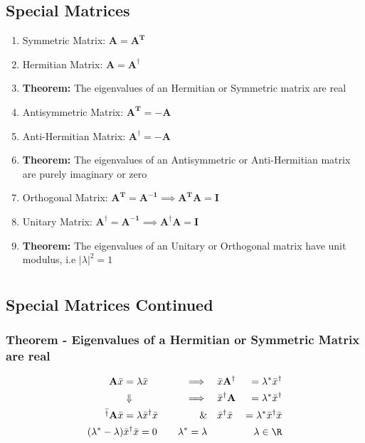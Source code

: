 \documentclass[a4paper, 11pt, normalem]{report}
\begin{document}
\section{Special Matrices}
\begin{enumerate}
    \item Symmetric Matrix: $\mathbf{A} = \mathbf{A^T}$
    \item Hermitian Matrix: $\mathbf{A} = \mathbf{A^{\dagger}}$
    \item[] \textbf{Theorem:} The eigenvalues of an Hermitian or Symmetric matrix are real
    \item Antisymmetric Matrix: $\mathbf{A^T} = -\mathbf{A}$
    \item Anti-Hermitian Matrix: $\mathbf{A^{\dagger}} = -\mathbf{A}$
    \item[] \textbf{Theorem:} The eigenvalues of an Antisymmetric or Anti-Hermitian matrix are purely imaginary or zero
    \item Orthogonal Matrix: $\mathbf{A^T} = \mathbf{A^{-1}} \implies \mathbf{A^{T}A} = \mathbf{I}$
    \item Unitary Matrix: $\mathbf{A^{\dagger}} = \mathbf{A^{-1}} \implies \mathbf{A^{\dagger}A} = \mathbf{I}$
    \item[] \textbf{Theorem:} The eigenvalues of an Unitary or Orthogonal matrix have unit modulus, i.e $|\lambda|^{2} = 1$
\end{enumerate}

\chapter{}
\section{Special Matrices Continued}
\subsection{Theorem - Eigenvalues of a Hermitian or Symmetric Matrix are real}
\vspace{-20pt}
\begin{alignat*}{3}
    \mathbf{A}\bar{x} &= \lambda\bar{x} \quad& \implies \quad& \bar{x}\mathbf{A^{\dagger}} &= \lambda^{*}\bar{x}^{\dagger} \\
    & \Downarrow \quad& \implies \quad& \bar{x}^{\dagger}\mathbf{A} &= \lambda^{*}\bar{x}^\dagger \\
    \bar{^\dagger}\mathbf{A}\bar{x} &= \lambda\bar{x}^\dagger \bar{x} \quad& \& \quad& \bar{x}^\dagger \bar{x} &= \lambda^{*}\bar{x}^\dagger \bar{x} \\
    (\lambda^{*} - \lambda)&\bar{x}^{\dagger}\bar{x} = 0 \quad& \lambda^* = \lambda \quad& &\lambda \in \R
\end{alignat*}
\end{document}

